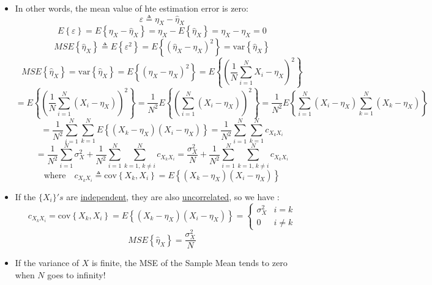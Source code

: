 \begin{itemize}
   \item In other words, the mean value of hte estimation error is zero:
\[
\varepsilon \triangleq \eta_X - \hat{\eta}_X
\]
\[
E\left\{ \varepsilon \right\} = E\left\{ \eta_X - \hat{\eta}_X \right\}
= \eta_X - E\left\{ \hat{\eta}_X \right\} = \eta_X - \eta_X = 0
\]
\[
MSE\left\{ \hat{\eta}_X \right\} \triangleq E\left\{ \varepsilon^2 \right\}
= E\left\{ (\hat{\eta}_X - \eta_X )^2 \right\}
= \mathrm{var} \left\{ \hat{\eta}_X \right\}
\]
\[
MSE\left\{ \hat{\eta}_X \right\} = \mathrm{var}\left\{\hat{\eta}_X\right\}
= E\left\{ (\hat{\eta}_X - \eta_X)^2 \right\}
= E\left\{ \left( \frac{1}{N} \sum_{i=1}^{N} X_i - \eta_X \right)^2 \right\}
\]
\[
= E\left\{ \left( \frac{1}{N} \sum_{i=1}^{N} (X_i - \eta_X) \right)^2 \right\}
= \frac{1}{N^2} E \left\{ \left( \sum_{i=1}^N (X_i - \eta_X) \right)^2 \right\}
= \frac{1}{N^2} E \left\{ \sum_{i=1}^N (X_i - \eta_X) \sum_{k=1}^N (X_k - \eta_X) \right\}
\]
\[
= \frac{1}{N^2} \sum_{i=1}^N \sum_{k=1}^N E\left\{ (X_k - \eta_X)(X_i - \eta_X) \right\}
= \frac{1}{N^2} \sum_{i=1}^N \sum_{k=1}^N c_{X_k X_i}
\]
\[
= \frac{1}{N^2} \sum_{i=1}^N \sigma_X^2 + \frac{1}{N^2} \sum_{i=1}^N \sum_{k=1,\,k\neq i}^N c_{X_k X_i}
= \frac{\sigma_X^2}{N} + \frac{1}{N^2} \sum_{i=1}^N \sum_{k=1,\,k\neq i}^N c_{X_k X_i}
\]
\[
\text{where} \quad c_{X_k X_i} \triangleq \mathrm{cov}\left\{ X_k, X_i \right\}
= E\left\{ (X_k - \eta_X)(X_i - \eta_X) \right\}
\]
\item If the \(\{X_i\}'s\) are \underline{independent}, they are also \underline{uncorrelated}, so we have :
\[
c_{X_k X_i} = \mathrm{cov}\left\{ X_k, X_i \right\}
= E\left\{ (X_k - \eta_X)(X_i - \eta_X) \right\}
= \begin{cases}
\sigma_X^2 & i = k \\
0 & i \neq k
\end{cases}
\]
\[
MSE\left\{ \hat{\eta}_X \right\} = \frac{\sigma_X^2}{N}
\]
\item If the variance of \(X\) is finite, the MSE of the Sample Mean tends to zero when \(N\) goes to infinity!


\end{itemize}
